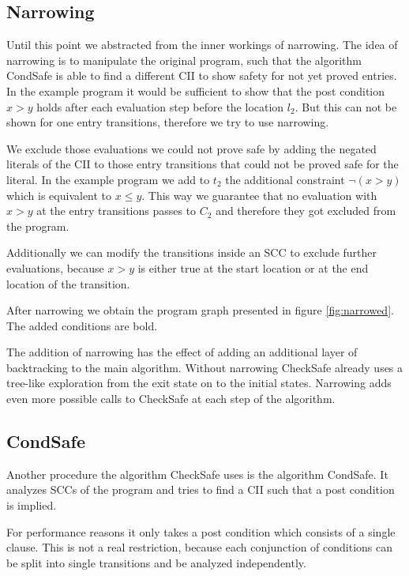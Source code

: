 

\subsection{Narrowing}

Until this point we abstracted from the inner workings of narrowing.
The idea of narrowing is to manipulate the original program, such that the algorithm CondSafe is able to find a different CII to show safety for not yet proved entries.
In the example program it would be sufficient to show that the post condition $x > y$ holds after each evaluation step before the location $l_2$.
But this can not be shown for one entry transitions, therefore we try to use narrowing.



We exclude those evaluations we could not prove safe by adding the negated literals of the CII to those entry transitions that could not be proved safe for the literal.
In the example program we add to $t_2$ the additional constraint $\neg (x > y)$ which is equivalent to $x \leq y$.
This way we guarantee that no evaluation with $x > y$ at the entry transitions passes to $C_2$ and therefore they got excluded from the program.

Additionally we can modify the transitions inside an SCC to exclude further evaluations, because $x > y$ is either true at the start location or at the end location of the transition.

After narrowing we obtain the program graph presented in figure \ref{fig:narrowed}. The added conditions are bold.



The addition of narrowing has the effect of adding an additional layer of backtracking to the main algorithm.
Without narrowing CheckSafe already uses a tree-like exploration from the exit state on to the initial states.
Narrowing adds even more possible calls to CheckSafe at each step of the algorithm.

\subsection{CondSafe}

Another procedure the algorithm CheckSafe uses is the algorithm CondSafe.
It analyzes SCCs of the program and tries to find a CII such that a post condition is implied.

For performance reasons it only takes a post condition which consists of a single clause.
This is not a real restriction, because each conjunction of conditions can be split into single transitions and be analyzed independently.

